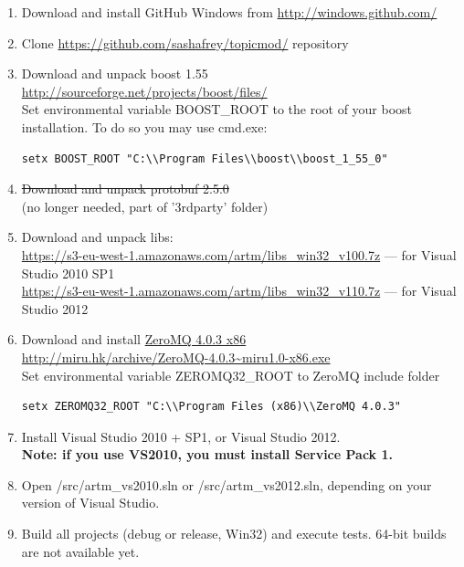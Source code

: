 \documentclass[11pt,a4paper,twoside]{report}
\begin{document}
\begin{enumerate}
   \item Download and install GitHub Windows from \url{http://windows.github.com/}
   \item Clone \url{https://github.com/sashafrey/topicmod/} repository
   \item Download and unpack boost 1.55  \\
         \url{http://sourceforge.net/projects/boost/files/} \\
         Set environmental variable BOOST\_ROOT to the root of your boost installation.
         To do so you may use cmd.exe:
\begin{verbatim}
setx BOOST_ROOT "C:\\Program Files\\boost\\boost_1_55_0"
\end{verbatim}
   \item \st{Download and unpack protobuf 2.5.0} \\ (no longer needed, part of '3rdparty' folder)
   \item Download and unpack libs: \\
    \url{https://s3-eu-west-1.amazonaws.com/artm/libs_win32_v100.7z} --- for Visual Studio 2010 SP1 \\
    \url{https://s3-eu-west-1.amazonaws.com/artm/libs_win32_v110.7z} --- for Visual Studio 2012
   \item Download and install \href{http://zeromq.org/distro:microsoft-windows}{ZeroMQ 4.0.3 x86} \\
         \url{http://miru.hk/archive/ZeroMQ-4.0.3~miru1.0-x86.exe} \\
         Set environmental variable ZEROMQ32\_ROOT to ZeroMQ include folder
\begin{verbatim}
setx ZEROMQ32_ROOT "C:\\Program Files (x86)\\ZeroMQ 4.0.3"
\end{verbatim}
    \item Install Visual Studio 2010 + SP1, or Visual Studio 2012. \\
    {\bf Note: if you use VS2010, you must install Service Pack 1.}
    \item Open /src/artm\_vs2010.sln or /src/artm\_vs2012.sln, depending on your version of Visual Studio.
    \item Build all projects (debug or release, Win32) and execute tests. 64-bit builds are not available yet.
\end{enumerate}
\end{document}

